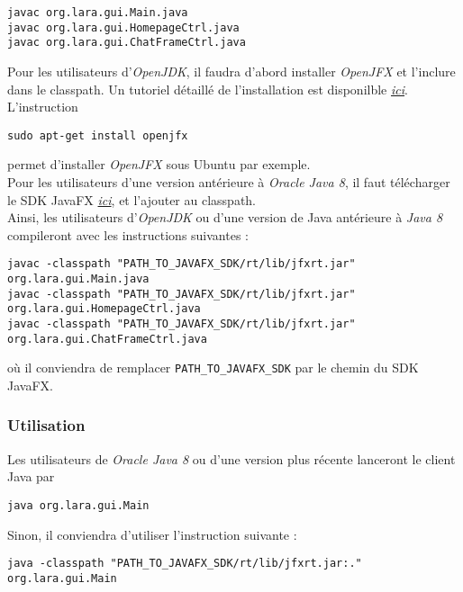 \documentclass[10pt,a4paper]{article}
\begin{document}
\begin{center}
    \texttt{javac org.lara.gui.Main.java} \\
    \texttt{javac org.lara.gui.HomepageCtrl.java}\\
    \texttt{javac org.lara.gui.ChatFrameCtrl.java}
\end{center}

Pour les utilisateurs d'\textit{OpenJDK}, il faudra d'abord installer \textit{OpenJFX} et l'inclure dans le classpath. Un tutoriel détaillé de l'installation est disponilble \href{https://wiki.openjdk.java.net/display/OpenJFX/Building+OpenJFX}{\textit{ici}}. L'instruction 

\begin{center}
    \texttt{sudo apt-get install openjfx}
\end{center}
permet d'installer \textit{OpenJFX} sous Ubuntu par exemple. \\

Pour les utilisateurs d'une version antérieure à \textit{Oracle Java 8}, il faut télécharger le SDK JavaFX \href{https://gluonhq.com/products/javafx/}{\textit{ici}}, et l'ajouter au classpath. \\

Ainsi, les utilisateurs d'\textit{OpenJDK} ou d'une version de Java antérieure à \textit{Java 8} compileront avec les instructions suivantes :
\begin{center}
    \texttt{javac -classpath "PATH\_TO\_JAVAFX\_SDK/rt/lib/jfxrt.jar" org.lara.gui.Main.java} \\
    \texttt{javac -classpath "PATH\_TO\_JAVAFX\_SDK/rt/lib/jfxrt.jar" org.lara.gui.HomepageCtrl.java} \\
    \texttt{javac -classpath "PATH\_TO\_JAVAFX\_SDK/rt/lib/jfxrt.jar" org.lara.gui.ChatFrameCtrl.java}
\end{center}
où il conviendra de remplacer \texttt{PATH\_TO\_JAVAFX\_SDK} par le chemin du SDK JavaFX. 

\subsubsection{Utilisation}

Les utilisateurs de \textit{Oracle Java 8} ou d'une version plus récente lanceront le client Java par
\begin{center}
    \texttt{java org.lara.gui.Main}
\end{center}

Sinon, il conviendra d'utiliser l'instruction suivante :
\begin{center}
    \texttt{java -classpath "PATH\_TO\_JAVAFX\_SDK/rt/lib/jfxrt.jar:." org.lara.gui.Main}
\end{center}
\end{document}

